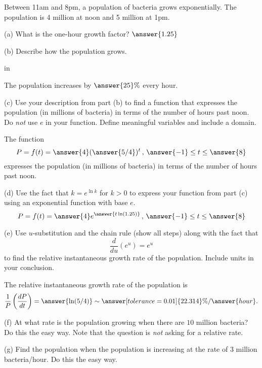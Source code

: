 \documentclass{ximera}
\newcommand{\pskip}{\vskip 0.1 in}
\begin{document}
\begin{question}  \label{Qe545tgbvb}
Between 11am and 8pm, a population of bacteria grows exponentially. The population is 4 million at noon and 5 million at 1pm.

(a) What is the one-hour growth factor?  $\answer{1.25}$

(b) Describe how the population grows. 

\pskip

The population increases by $\answer{25}\%$ every hour.

(c) Use your description from part (b) to find a function that expresses the population (in millions of bacteria) in terms of the number of hours past noon. Do \emph{not} use $e$ in your function. Define meaningful variables and include a domain.

The function 
\[
  P= f(t) = \answer{4}(\answer{5/4})^t \, , \, \answer{-1} \leq t \leq \answer{8}
\]
expresses the population (in millions of bacteria) in terms of the number of hours past noon.


(d) Use the fact that $k = e^{\ln k}$ for $k>0$ to express your function from part (c) using an exponential function with base $e$.
\[
      P= f(t) = \answer{4}e^{\answer{t \ln(1.25)}} \, , \, \answer{-1} \leq t \leq \answer{8}
\]


(e) Use $u$-substitution and the chain rule (show all steps) along with the fact that 
\[
     \frac{d}{du}(e^{u}) = e^{u}
\]
to find the relative instantaneous growth rate of the population. Include units in your conclusion.

The relative instantaneous growth rate of the population is 
\[
      \frac{1}{P}\left(  \frac{dP}{dt}  \right) = \answer{\ln(5/4)} \sim \answer[tolerance=0.01]{22.314}\%/\answer{hour} .
\]


(f) At what rate is the population growing when there are $10$ million bacteria? Do this the easy way. Note that the question is \emph{not} asking for a relative rate.

(g) Find the population when the population is increasing at the rate of $3$ million bacteria/hour. Do this the easy way. 
\end{question}
\end{document}
